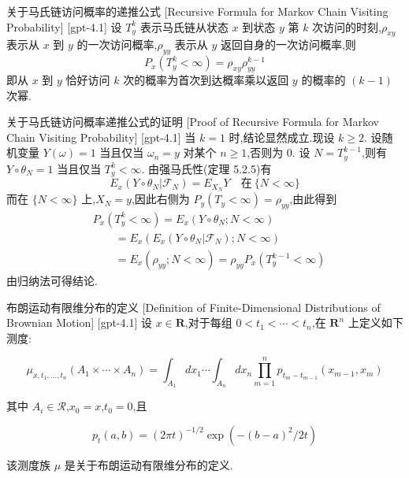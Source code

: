 \documentclass[UTF8]{ctexart}
\begin{document}
    
    
    \begin{thm}
        {关于马氏链访问概率的递推公式}
        [Recursive Formula for Markov Chain Visiting Probability]
        [gpt-4.1]
        设 $T_y^k$ 表示马氏链从状态 $x$ 到状态 $y$ 第 $k$ 次访问的时刻,$\rho_{xy}$ 表示从 $x$ 到 $y$ 的一次访问概率,$\rho_{yy}$ 表示从 $y$ 返回自身的一次访问概率,则
\[
P_{x}(T_y^k < \infty) = \rho_{xy} \rho_{yy}^{k-1}
\]
即从 $x$ 到 $y$ 恰好访问 $k$ 次的概率为首次到达概率乘以返回 $y$ 的概率的 $(k-1)$ 次幂.
    \end{thm}
    
    
    
    \begin{prf}
        {关于马氏链访问概率递推公式的证明}
        [Proof of Recursive Formula for Markov Chain Visiting Probability]
        [gpt-4.1]
        当 $k=1$ 时,结论显然成立.现设 $k \geq 2$.
设随机变量 $Y(\omega) = 1$ 当且仅当 $\omega_n = y$ 对某个 $n \geq 1$,否则为 $0$.
设 $N = T_y^{k-1}$,则有 $Y \circ \theta_N = 1$ 当且仅当 $T_y^k < \infty$.
由强马氏性(定理 5.2.5)有
\[
E_x(Y \circ \theta_N | \mathcal{F}_N) = E_{X_N} Y \quad \text{在}~ \{N < \infty\}
\]
而在 $\{N < \infty\}$ 上,$X_N = y$,因此右侧为 $P_y(T_y < \infty) = \rho_{yy}$,由此得到
\[
\begin{array}{rl}
& P_x(T_y^k < \infty) = E_x(Y \circ \theta_N; N < \infty) \\
& \qquad = E_x(E_x(Y \circ \theta_N | \mathcal{F}_N); N < \infty) \\
& \qquad = E_x(\rho_{yy}; N < \infty) = \rho_{yy} P_x(T_y^{k-1} < \infty)
\end{array}
\]
由归纳法可得结论.
    \end{prf}
    
    
    
    \begin{dfn}
        {布朗运动有限维分布的定义}
        [Definition of Finite-Dimensional Distributions of Brownian Motion]
        [gpt-4.1]
        设 $x \in \mathbf{R}$,对于每组 $0 < t _ { 1 } < \cdots < t _ { n }$,在 $\mathbf{R}^n$ 上定义如下测度:

\[
\mu _ { x , t _ { 1 } , \ldots , t _ { n } } ( A _ { 1 } \times \cdots \times A _ { n } ) = \int _ { A _ { 1 } } d x _ { 1 } \cdots \int _ { A _ { n } } d x _ { n } \prod _ { m = 1 } ^ { n } p _ { t _ { m } - t _ { m - 1 } } ( x _ { m - 1 } , x _ { m } )
\]

其中 $A _ { i } \in \mathcal{R}$,$x _ { 0 } = x$,$t _ { 0 } = 0$,且

\[
p _ { t } ( a , b ) = ( 2 \pi t ) ^ { - 1 / 2 } \exp ( - ( b - a ) ^ { 2 } / 2 t )
\]

该测度族 $\mu$ 是关于布朗运动有限维分布的定义.

    \end{dfn}
    
\end{document}
